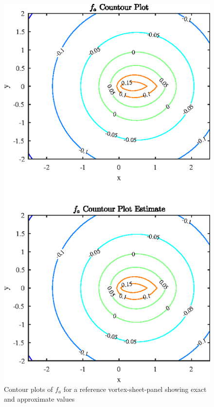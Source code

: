 


  
\begin{figure}[H]
\centering
\includegraphics[scale=1.40]{graphs/e2g1.eps}
\caption{Contour plots of $f_a$ for a reference vortex-sheet-panel showing exact and approximate values}
\label{e2g1}
\end{figure}

